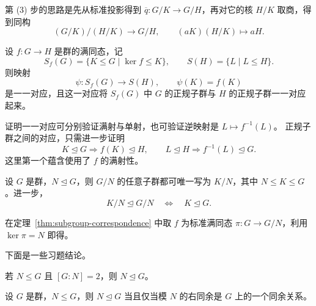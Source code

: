 \begin{purplenote}
第 (3) 步的思路是先从标准投影得到 $\overline q:G/K\to G/H$，再对它的核 $H/K$ 取商，得到同构
\[
  (G/K)/(H/K)\longrightarrow G/H,
  \qquad (aK)(H/K)\longmapsto aH.
\]
\end{purplenote}

\begin{theorem}[子群对应定理]\label{thm:subgroup-correspondence}
设 $f:G\to H$ 是群的满同态，记
\[
  S_f(G)=\{K\leq G\mid\ker f\leq K\},
  \qquad S(H)=\{L\mid L\leq H\}.
\]
则映射
\[
  \psi:S_f(G)\longrightarrow S(H),\qquad\psi(K)=f(K)
\]
是一一对应，且这一对应将 $S_f(G)$ 中 $G$ 的正规子群与 $H$ 的正规子群一一对应起来。
\end{theorem}

\begin{purplenote}
证明一一对应可分别验证满射与单射，也可验证逆映射是 $L\mapsto f^{-1}(L)$。
正规子群之间的对应，只需进一步证明
\[
  K\trianglelefteq G\Longrightarrow f(K)\trianglelefteq H,
  \qquad
  L\trianglelefteq H\Longrightarrow f^{-1}(L)\trianglelefteq G.
\]
这里第一个蕴含使用了 $f$ 的满射性。
\end{purplenote}

\begin{corollary}\label{cor:quotient-subgroup-correspondence}
设 $G$ 是群，$N\trianglelefteq G$，则 $G/N$ 的任意子群都可唯一写为 $K/N$，其中 $N\leq K\leq G$。进一步，
\[
  K/N\trianglelefteq G/N\quad\Longleftrightarrow\quad K\trianglelefteq G.
\]
\end{corollary}

\begin{purplenote}
在定理~\ref{thm:subgroup-correspondence} 中取 $f$ 为标准满同态 $\pi:G\to G/N$，利用 $\ker\pi=N$ 即得。

下面是一些习题结论。
\end{purplenote}

\begin{proposition}[指数为二的子群]\label{prop:index-two-normal}
若 $N\leq G$ 且 $[G:N]=2$，则 $N\trianglelefteq G$。
\end{proposition}

\begin{proposition}\label{prop:normal-congruence}
设 $G$ 是群，$N\leq G$，则 $N\trianglelefteq G$ 当且仅当模 $N$ 的右同余是 $G$ 上的一个同余关系。
\end{proposition}


